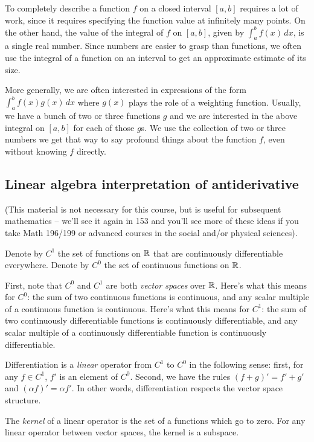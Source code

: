 \documentclass[10pt]{amsart}
\begin{document}
To completely describe a function $f$ on a closed interval $[a,b]$
requires a lot of work, since it requires specifying the function
value at infinitely many points. On the other hand, the value of the
integral of $f$ on $[a,b]$, given by $\int_a^b f(x) \, dx$, is a
single real number. Since numbers are easier to grasp than functions,
we often use the integral of a function on an interval to get an
approximate estimate of its size.

More generally, we are often interested in expressions of the form
$\int_a^b f(x)g(x) \, dx$ where $g(x)$ plays the role of a weighting
function. Usually, we have a bunch of two or three functions $g$ and
we are interested in the above integral on $[a,b]$ for each of those
$g$s. We use the collection of two or three numbers we get that way to
say profound things about the function $f$, even without knowing $f$
directly.


\subsection{Linear algebra interpretation of antiderivative}

(This material is not necessary for this course, but is useful for
subsequent mathematics -- we'll see it again in 153 and you'll see
more of these ideas if you take Math 196/199 or advanced courses in
the social and/or physical sciences).

Denote by $C^1$ the set of functions on $\mathbb{R}$ that are continuously
differentiable everywhere. Denote by $C^0$ the set of continuous
functions on $\mathbb{R}$.

First, note that $C^0$ and $C^1$ are both {\em vector spaces} over
$\mathbb{R}$. Here's what this means for $C^0$: the sum of two continuous
functions is continuous, and any scalar multiple of a continuous
function is continuous. Here's what this means for $C^1$: the sum of
two continuously differentiable functions is continuously
differentiable, and any scalar multiple of a continuously
differentiable function is continuously differentiable.

Differentiation is a {\em linear} operator from $C^1$ to $C^0$ in the
following sense: first, for any $f \in C^1$, $f'$ is an element of
$C^0$. Second, we have the rules $(f + g)' = f' + g'$ and $(\alpha f)'
= \alpha f'$. In other words, differentiation respects the vector
space structure.

The {\em kernel} of a linear operator is the set of a functions which
go to zero. For any linear operator between vector spaces, the kernel
is a subspace.
\end{document}
